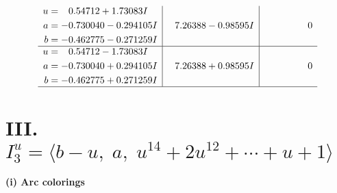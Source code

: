 \documentclass[1p]{elsarticle_modified}
\theoremstyle{definition}
\begin{document}
$$\begin{array}{c|c|c}
\begin{aligned}
u &= \phantom{-}0.54712 + 1.73083 I \\
a &= -0.730040 - 0.294105 I \\
b &= -0.462775 - 0.271259 I\end{aligned}
 & \phantom{-}7.26388 - 0.98595 I & \phantom{-0.000000 } 0 \\ \hline\begin{aligned}
u &= \phantom{-}0.54712 - 1.73083 I \\
a &= -0.730040 + 0.294105 I \\
b &= -0.462775 + 0.271259 I\end{aligned}
 & \phantom{-}7.26388 + 0.98595 I & \phantom{-0.000000 } 0\\
 \hline 
 \end{array}$$\newpage\newpage\renewcommand{\arraystretch}{1}
\centering \section*{III. $I^u_{3}= \langle b- u,\;a,\;u^{14}+2 u^{12}+\cdots+u+1 \rangle$}
\flushleft \textbf{(i) Arc colorings}\\
\end{document}
